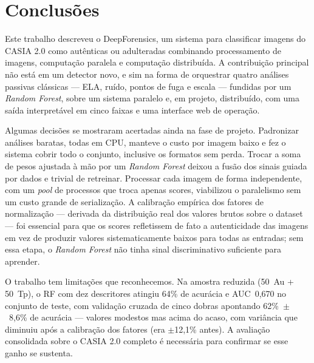 \documentclass[12pt]{article}
\begin{document}

\section{Conclusões}

Este trabalho descreveu o DeepForensics, um sistema para classificar imagens do
CASIA 2.0 como autênticas ou adulteradas combinando processamento de imagens,
computação paralela e computação distribuída. A contribuição principal não está
em um detector novo, e sim na forma de orquestrar quatro análises passivas
clássicas --- ELA, ruído, pontos de fuga e escala --- fundidas por um
\textit{Random Forest}, sobre um sistema paralelo e, em projeto, distribuído, com
uma saída interpretável em cinco faixas e uma interface web de operação.

Algumas decisões se mostraram acertadas ainda na fase de projeto. Padronizar
análises baratas, todas em CPU, manteve o custo por imagem baixo e fez o sistema
cobrir todo o conjunto, inclusive os formatos sem perda. Trocar a soma de pesos
ajustada à mão por um \textit{Random Forest} deixou a fusão dos sinais guiada por
dados e trivial de retreinar. Processar cada imagem de forma independente, com um
\textit{pool} de processos que troca apenas scores, viabilizou o paralelismo sem
um custo grande de serialização. A calibração empírica dos fatores de
normalização --- derivada da distribuição real dos valores brutos sobre o dataset
--- foi essencial para que os scores refletissem de fato a autenticidade das
imagens em vez de produzir valores sistematicamente baixos para todas as entradas;
sem essa etapa, o \textit{Random Forest} não tinha sinal discriminativo suficiente
para aprender.

O trabalho tem limitações que reconhecemos. Na amostra reduzida (50~Au + 50~Tp),
o RF com dez descritores atingiu 64\% de acurácia e AUC~0,670 no conjunto de
teste, com validação cruzada de cinco dobras apontando 62\%~$\pm$~8,6\% de
acurácia --- valores modestos mas acima do acaso, com variância que diminuiu após
a calibração dos fatores (era $\pm$12,1\% antes). A avaliação consolidada sobre o
CASIA 2.0 completo é necessária para confirmar se esse ganho se sustenta.
\end{document}
